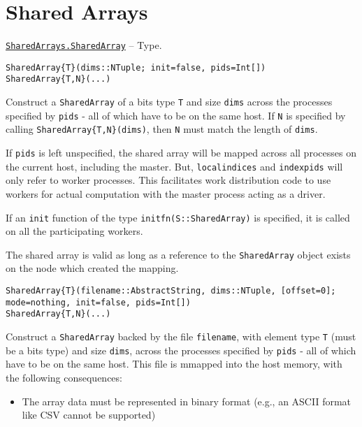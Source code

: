 \hypertarget{9408116725884557649}{}


\chapter{Shared Arrays}


\hypertarget{15069300442338861576}{} 
\hyperlink{15069300442338861576}{\texttt{SharedArrays.SharedArray}}  -- {Type.}

\begin{adjustwidth}{2em}{0pt}


\begin{verbatim}
SharedArray{T}(dims::NTuple; init=false, pids=Int[])
SharedArray{T,N}(...)
\end{verbatim}

Construct a \texttt{SharedArray} of a bits type \texttt{T} and size \texttt{dims} across the processes specified by \texttt{pids} - all of which have to be on the same host.  If \texttt{N} is specified by calling \texttt{SharedArray\{T,N\}(dims)}, then \texttt{N} must match the length of \texttt{dims}.

If \texttt{pids} is left unspecified, the shared array will be mapped across all processes on the current host, including the master. But, \texttt{localindices} and \texttt{indexpids} will only refer to worker processes. This facilitates work distribution code to use workers for actual computation with the master process acting as a driver.

If an \texttt{init} function of the type \texttt{initfn(S::SharedArray)} is specified, it is called on all the participating workers.

The shared array is valid as long as a reference to the \texttt{SharedArray} object exists on the node which created the mapping.


\begin{lstlisting}
SharedArray{T}(filename::AbstractString, dims::NTuple, [offset=0]; mode=nothing, init=false, pids=Int[])
SharedArray{T,N}(...)
\end{lstlisting}

Construct a \texttt{SharedArray} backed by the file \texttt{filename}, with element type \texttt{T} (must be a bits type) and size \texttt{dims}, across the processes specified by \texttt{pids} - all of which have to be on the same host. This file is mmapped into the host memory, with the following consequences:

\begin{itemize}
\item The array data must be represented in binary format (e.g., an ASCII format like CSV cannot be supported)



\end{itemize}
\end{adjustwidth}

